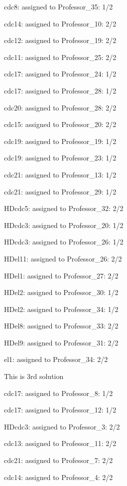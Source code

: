 \documentclass{article} %
\begin{document}
\noindent cdc8: assigned to Professor\_35: 1/2

\noindent cdc14: assigned to Professor\_10: 2/2

\noindent cdc12: assigned to Professor\_19: 2/2

\noindent cdc11: assigned to Professor\_25: 2/2

\noindent cdc17: assigned to Professor\_24: 1/2

\noindent cdc17: assigned to Professor\_28: 1/2

\noindent cdc20: assigned to Professor\_28: 2/2

\noindent cdc15: assigned to Professor\_20: 2/2

\noindent cdc19: assigned to Professor\_19: 1/2

\noindent cdc19: assigned to Professor\_23: 1/2

\noindent cdc21: assigned to Professor\_13: 1/2

\noindent cdc21: assigned to Professor\_29: 1/2

\noindent HDcdc5: assigned to Professor\_32: 2/2

\noindent HDcdc3: assigned to Professor\_20: 1/2

\noindent HDcdc3: assigned to Professor\_26: 1/2

\noindent HDel11: assigned to Professor\_26: 2/2

\noindent HDel1: assigned to Professor\_27: 2/2

\noindent HDel2: assigned to Professor\_30: 1/2

\noindent HDel2: assigned to Professor\_34: 1/2

\noindent HDel8: assigned to Professor\_33: 2/2

\noindent HDel9: assigned to Professor\_31: 2/2

\noindent el1: assigned to Professor\_34: 2/2

\noindent 

\noindent  This is 3rd solution

\noindent cdc17: assigned to Professor\_8: 1/2

\noindent cdc17: assigned to Professor\_12: 1/2

\noindent HDcdc3: assigned to Professor\_3: 2/2

\noindent cdc13: assigned to Professor\_11: 2/2

\noindent cdc21: assigned to Professor\_7: 2/2

\noindent cdc14: assigned to Professor\_4: 2/2
\end{document}
